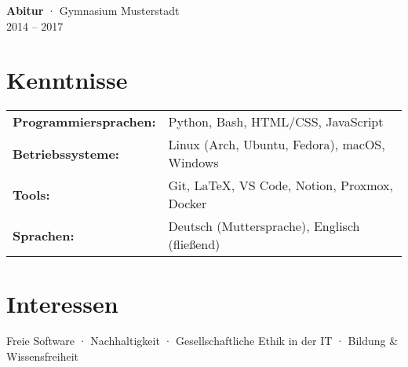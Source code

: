 \documentclass[12pt,a4paper]{article}
\begin{document}
\textbf{Abitur} · Gymnasium Musterstadt\\
2014 – 2017

\section*{Kenntnisse}

\renewcommand{\arraystretch}{1.3}
\noindent
\begin{tabular}{@{}p{5.2cm}p{10cm}@{}}
\textbf{Programmiersprachen:} & Python, Bash, HTML/CSS, JavaScript \\
\textbf{Betriebssysteme:}     & Linux (Arch, Ubuntu, Fedora), macOS, Windows \\
\textbf{Tools:}               & Git, LaTeX, VS Code, Notion, Proxmox, Docker \\
\textbf{Sprachen:}            & Deutsch (Muttersprache), Englisch (fließend)
\end{tabular}

\section*{Interessen}

Freie Software · Nachhaltigkeit · Gesellschaftliche Ethik in der IT · Bildung \& Wissensfreiheit
\end{document}
